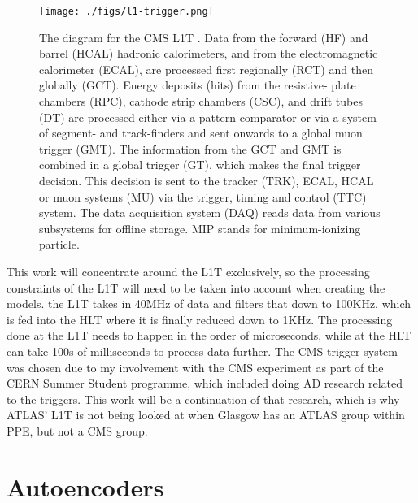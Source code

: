 \documentclass[a4paper]{article}
\theoremstyle{plain}
\theoremstyle{definition}
\begin{document}
	\begin{figure}[H]
		\centering
		\texttt{[image: ./figs/l1-trigger.png]}
		\small\caption{The diagram for the CMS L1T \cite{trigger-system}. Data from the forward (HF) and barrel (HCAL) hadronic calorimeters, and from the electromagnetic calorimeter (ECAL), are processed first regionally (RCT) and then globally (GCT). Energy deposits (hits) from the resistive- plate chambers (RPC), cathode strip chambers (CSC), and drift tubes (DT) are processed either via a pattern comparator or via a system of segment- and track-finders and sent onwards to a global muon trigger (GMT). The information from the GCT and GMT is combined in a global trigger (GT), which makes the final trigger decision. This decision is sent to the tracker (TRK), ECAL, HCAL or muon systems (MU) via the trigger, timing and control (TTC) system. The data acquisition system (DAQ) reads data from various subsystems for offline storage. MIP stands for minimum-ionizing particle.}
		\label{fig:trigger}
	\end{figure}
	
    This work will concentrate around the L1T exclusively, so the processing constraints of the L1T will need to be taken into account when creating the models. the L1T takes in 40MHz of data and filters that down to 100KHz, which is fed into the HLT where it is finally reduced down to 1KHz. The processing done at the L1T needs to happen in the order of microseconds, while at the HLT can take 100s of milliseconds to process data further. The CMS trigger system was chosen due to my involvement with the CMS experiment as part of the CERN Summer Student programme, which included doing AD research related to the triggers. This work will be a continuation of that research, which is why ATLAS' L1T is not being looked at when Glasgow has an ATLAS group within PPE, but not a CMS group.
    
    \section{Autoencoders}
	\label{sec:ae}
	
\end{document}
